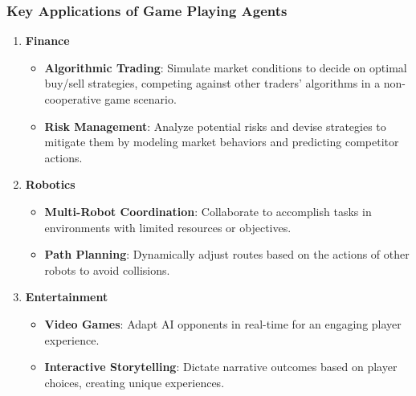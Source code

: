 \documentclass[aspectratio=169]{beamer}
\begin{document}
\begin{frame}[fragile]
  \frametitle{Key Applications of Game Playing Agents}
  \begin{enumerate}
    \item \textbf{Finance}
    \begin{itemize}
      \item \textbf{Algorithmic Trading}: Simulate market conditions to decide on optimal buy/sell strategies, competing against other traders’ algorithms in a non-cooperative game scenario.
      \item \textbf{Risk Management}: Analyze potential risks and devise strategies to mitigate them by modeling market behaviors and predicting competitor actions.
    \end{itemize}

    \item \textbf{Robotics}
    \begin{itemize}
      \item \textbf{Multi-Robot Coordination}: Collaborate to accomplish tasks in environments with limited resources or objectives.
      \item \textbf{Path Planning}: Dynamically adjust routes based on the actions of other robots to avoid collisions.
    \end{itemize}

    \item \textbf{Entertainment}
    \begin{itemize}
      \item \textbf{Video Games}: Adapt AI opponents in real-time for an engaging player experience.
      \item \textbf{Interactive Storytelling}: Dictate narrative outcomes based on player choices, creating unique experiences.
    \end{itemize}
  \end{enumerate}
\end{frame}
\end{document}
